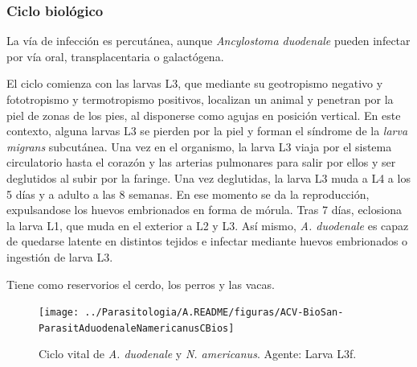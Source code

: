 \subsubsection{Ciclo biológico}
La vía de infección es percutánea, aunque \textit{Ancylostoma duodenale} pueden infectar por vía oral, transplacentaria o galactógena.

El ciclo comienza con las larvas L3, que mediante su geotropismo negativo y fototropismo y termotropismo positivos, localizan un animal y penetran por la piel de zonas de los pies, al disponerse como agujas en posición vertical. En este contexto, alguna larvas L3 se pierden por la piel y forman el síndrome de la \textit{larva migrans} subcutánea. Una vez en el organismo, la larva L3 viaja por el sistema circulatorio hasta el corazón y las arterias pulmonares para salir por ellos y ser deglutidos al subir por la faringe. Una vez deglutidas, la larva L3 muda a L4 a los 5 días y a adulto a las 8 semanas. En ese momento se da la reproducción, expulsandose los huevos embrionados en forma de mórula. Tras 7 días, eclosiona la larva L1, que muda en el exterior a L2 y L3. Así mismo, \textit{A. duodenale} es capaz de quedarse latente en distintos tejidos e infectar mediante huevos embrionados o ingestión de larva L3.

Tiene como reservorios el cerdo, los perros y las vacas.
\begin{figure}[H]
	\centering
	\texttt{[image: ../Parasitologia/A.README/figuras/ACV-BioSan-ParasitAduodenaleNamericanusCBios]}
	\caption[Ciclo vital de \textit{A. duodenale} y \textit{N. americanus}]{Ciclo vital de \textit{A. duodenale} y \textit{N. americanus}. Agente: Larva L3f.\label{fig:PARASIT:AduodenaleNamericanusCBios}}
\end{figure}

